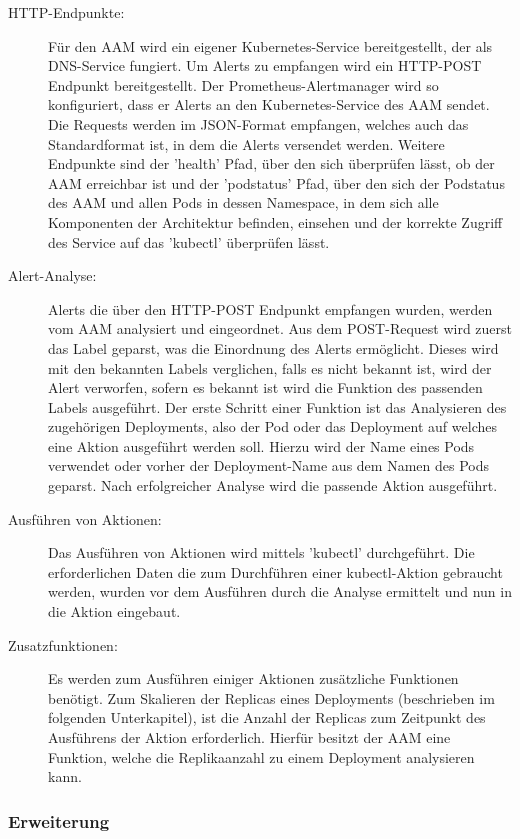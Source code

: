 \documentclass[a4paper,10pt]{scrartcl}
\begin{document}
\begin{description}

\item[HTTP-Endpunkte:]
Für den AAM wird ein eigener Kubernetes-Service bereitgestellt, der als DNS-Service fungiert.
Um Alerts zu empfangen wird ein HTTP-POST Endpunkt bereitgestellt. Der Prometheus-Alertmanager wird so konfiguriert, dass er Alerts an den Kubernetes-Service des AAM sendet. Die Requests werden im JSON-Format empfangen, welches auch das Standardformat ist, in dem die Alerts versendet werden.
Weitere Endpunkte sind der 'health' Pfad, über den sich überprüfen lässt, ob der AAM erreichbar ist und der 'podstatus' Pfad, über den sich der Podstatus des AAM und allen Pods in dessen Namespace, in dem sich alle Komponenten der Architektur befinden, einsehen und der korrekte Zugriff des Service auf das 'kubectl' überprüfen lässt.
\item[Alert-Analyse:]
Alerts die über den HTTP-POST Endpunkt empfangen wurden, werden vom AAM analysiert und eingeordnet. Aus dem POST-Request wird zuerst das Label geparst, was die Einordnung des Alerts ermöglicht. Dieses wird mit den bekannten Labels verglichen, falls es nicht bekannt ist, wird der Alert verworfen, sofern es bekannt ist wird die Funktion des passenden Labels ausgeführt. Der erste Schritt einer Funktion ist das Analysieren des zugehörigen Deployments, also der Pod oder das Deployment auf welches eine Aktion ausgeführt werden soll. Hierzu wird der Name eines Pods verwendet oder vorher der Deployment-Name aus dem Namen des Pods geparst.
Nach erfolgreicher Analyse wird die passende Aktion ausgeführt.
\item[Ausführen von Aktionen:]
Das Ausführen von Aktionen wird mittels 'kubectl' durchgeführt. Die erforderlichen Daten die zum Durchführen einer kubectl-Aktion gebraucht werden, wurden vor dem Ausführen durch die Analyse ermittelt und nun in die Aktion eingebaut.
\item[Zusatzfunktionen:]
Es werden zum Ausführen einiger Aktionen zusätzliche Funktionen benötigt. Zum Skalieren der Replicas eines Deployments (beschrieben im folgenden Unterkapitel), ist die Anzahl der Replicas zum Zeitpunkt des Ausführens der Aktion erforderlich. Hierfür besitzt der AAM eine Funktion, welche die Replikaanzahl zu einem Deployment analysieren kann.

\end{description}

\subsubsection{Erweiterung}
\end{document}
